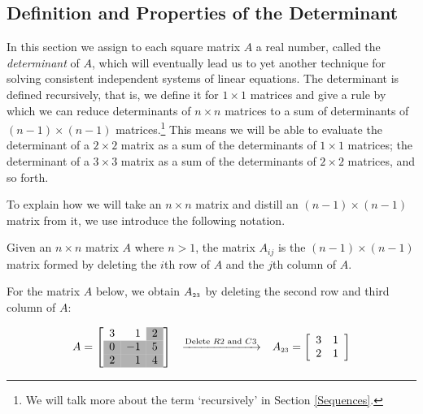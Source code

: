 \documentclass{ximera}
\begin{document}
	\author{Stitz-Zeager}




\setcounter{footnote}{0}

\label{Determinants}

\setlength{\extrarowheight}{0pt}

\subsection{Definition and Properties of the Determinant}

\label{determinantdefnandprops}

In this section we assign to each square matrix $A$ a real number, called the \textit{determinant} of $A$, which will eventually lead us to yet another technique for solving consistent independent systems of linear equations.  The determinant is defined recursively, that is, we define it for $1 \times 1$ matrices and give a rule by which we can reduce determinants of $n \times n$ matrices to a sum of determinants of $(n-1) \times (n-1)$ matrices.\footnote{We will talk more about the term `recursively' in Section \ref{Sequences}.}  This means we will be able to evaluate the determinant of a $2 \times 2$ matrix as a sum of the determinants of $1 \times 1$ matrices;  the determinant of a $3 \times 3$ matrix as a sum of the determinants of $2 \times 2$ matrices, and so forth.  

To explain how we will take an $n \times n$ matrix and distill an $(n-1) \times (n-1)$ matrix from it, we use introduce the following notation.

\smallskip

\begin{definition} \label{Aijdefn} Given an $n \times n$ matrix $A$ where $n>1$, the matrix $A_{ij}$ is the $(n-1) \times (n-1)$ matrix formed by deleting the $i$th row of $A$ and the $j$th column of $A$. 
\end{definition}

\smallskip

For the matrix $A$ below, we obtain $A_{\mbox{\tiny$23$}}$ by deleting the second row and third column of $A$:

\[ \begin{array}{ccc}

A = \left[ \begin{array}{rr>{\columncolor[gray]{0.7}}r} 3 &  1 & 2 \\ \rowcolor[gray]{0.7} 0 & -1 & 5 \\ 2 & 1 & 4 \\ \end{array} \right]
&
\xrightarrow{\text{Delete $R2$ and $C3$}}

&

A_{\mbox{\tiny$23$}} = \left[ \begin{array}{rr} 3 & 1 \\ 2 & 1 \\ \end{array} \right] \\

\end{array}\]
\end{document}
